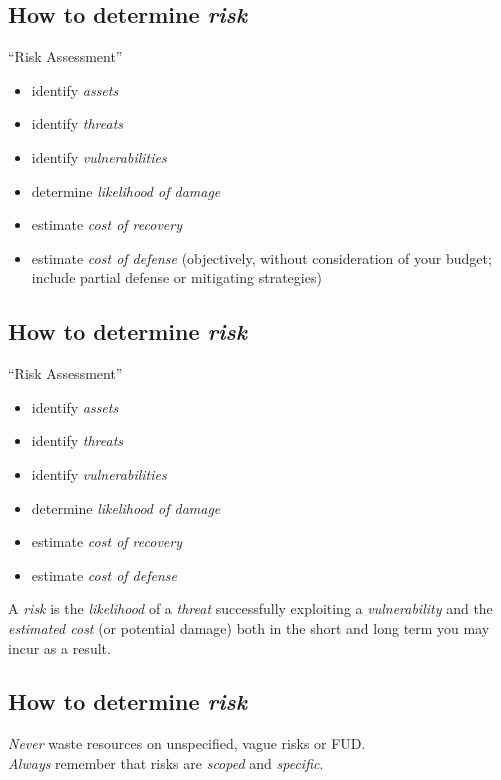 \documentclass[xga]{xdvislides}
\begin{document}
\subsection{How to determine {\em risk}}
``Risk Assessment''
\begin{itemize}
	\item identify {\em assets}
	\item identify {\em threats}
	\item identify {\em vulnerabilities}
	\item determine {\em likelihood of damage}
	\item estimate {\em cost of recovery}
	\item estimate {\em cost of defense} (objectively, without consideration of your budget; include partial defense or mitigating strategies)
\end{itemize}

\subsection{How to determine {\em risk}}
``Risk Assessment''
\begin{itemize}
	\item identify {\em assets}
	\item identify {\em threats}
	\item identify {\em vulnerabilities}
	\item determine {\em likelihood of damage}
	\item estimate {\em cost of recovery}
	\item estimate {\em cost of defense}
\end{itemize}
\vspace{.5in}

A {\em risk} is the {\em likelihood} of a {\em threat} successfully exploiting
a {\em vulnerability} and the {\em estimated cost} (or potential damage) both
in the short and long term you may incur as a result.

\subsection{How to determine {\em risk}}
\vspace*{\fill}
\Huge
\begin{center}
{\em Never} waste resources on unspecified, vague risks or FUD. \\
\addvspace{.5in}
{\em Always} remember that risks are {\em scoped} and {\em specific}.
\end{center}
\Normalsize
\vspace*{\fill}
\end{document}
